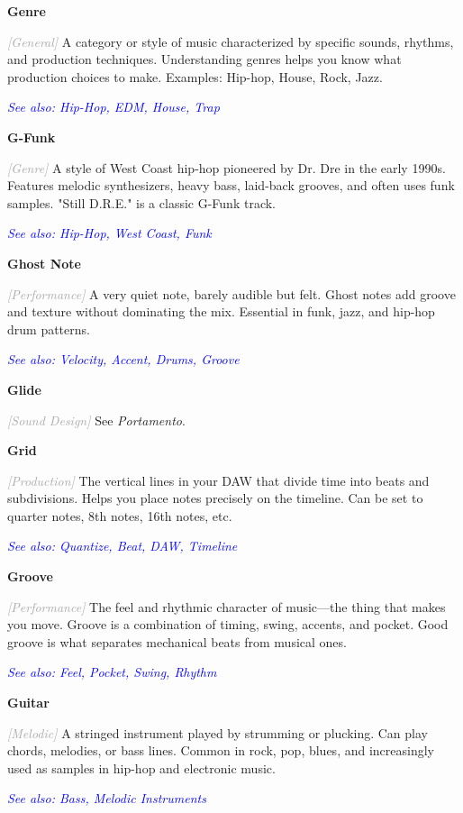 \documentclass[11pt,letterpaper]{article}
\newcommand{\term}[1]{\textbf{\large\color{purple}#1}}
\newcommand{\category}[1]{\textcolor{darkgray}{\textit{\small [#1]}}}
\newcommand{\seealso}[1]{\textcolor{blue}{\textit{See also: #1}}}
\newenvironment{termdef}[1]
  {\noindent\term{#1}\par\nopagebreak}
  {\par\vspace{0.3em}}
\begin{document}
\begin{termdef}{Genre}
\category{General}
A category or style of music characterized by specific sounds, rhythms, and production techniques. Understanding genres helps you know what production choices to make. Examples: Hip-hop, House, Rock, Jazz.

\seealso{Hip-Hop, EDM, House, Trap}
\end{termdef}

\begin{termdef}{G-Funk}
\category{Genre}
A style of West Coast hip-hop pioneered by Dr. Dre in the early 1990s. Features melodic synthesizers, heavy bass, laid-back grooves, and often uses funk samples. "Still D.R.E." is a classic G-Funk track.

\seealso{Hip-Hop, West Coast, Funk}
\end{termdef}

\begin{termdef}{Ghost Note}
\category{Performance}
A very quiet note, barely audible but felt. Ghost notes add groove and texture without dominating the mix. Essential in funk, jazz, and hip-hop drum patterns.

\seealso{Velocity, Accent, Drums, Groove}
\end{termdef}

\begin{termdef}{Glide}
\category{Sound Design}
See \textit{Portamento}.
\end{termdef}

\begin{termdef}{Grid}
\category{Production}
The vertical lines in your DAW that divide time into beats and subdivisions. Helps you place notes precisely on the timeline. Can be set to quarter notes, 8th notes, 16th notes, etc.

\seealso{Quantize, Beat, DAW, Timeline}
\end{termdef}

\begin{termdef}{Groove}
\category{Performance}
The feel and rhythmic character of music—the thing that makes you move. Groove is a combination of timing, swing, accents, and pocket. Good groove is what separates mechanical beats from musical ones.

\seealso{Feel, Pocket, Swing, Rhythm}
\end{termdef}

\begin{termdef}{Guitar}
\category{Melodic}
A stringed instrument played by strumming or plucking. Can play chords, melodies, or bass lines. Common in rock, pop, blues, and increasingly used as samples in hip-hop and electronic music.

\seealso{Bass, Melodic Instruments}
\end{termdef}
\end{document}

